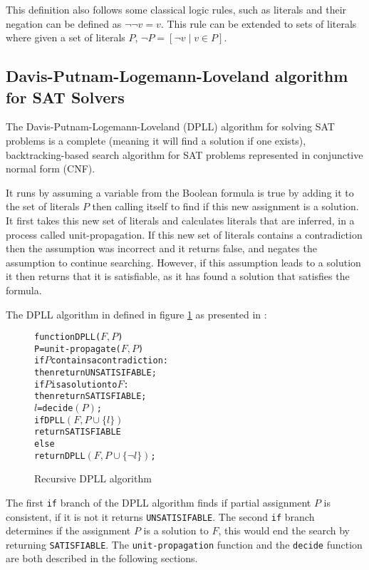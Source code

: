 This definition also follows some classical logic rules, such as literals and their negation can be defined as $\neg \neg v = v$.
This rule can be extended to sets of literals where given a set of literals $P$, $\neg P = [\neg v \mid v \in P]$.

\subsection{Davis-Putnam-Logemann-Loveland algorithm for SAT Solvers}
The Davis-Putnam-Logemann-Loveland (DPLL) algorithm \citep{Davis1960, davis1962machine} for solving SAT problems is a complete (meaning it will find a solution if one exists), 
backtracking-based search algorithm for SAT problems represented in conjunctive normal form (CNF).

It runs by assuming a variable from the Boolean formula is true by adding it to the set of literals $P$ then calling itself to find if this new assignment is a solution.
It first takes this new set of literals and calculates literals that are inferred, in a process called unit-propagation. 
If this new set of literals contains a contradiction then the assumption was incorrect and it returns false, and negates the assumption to continue searching.
However, if this assumption leads to a solution it then returns that it is satisfiable, as it has found a solution that satisfies the formula.

The DPLL algorithm in defined in figure \ref{impl.DPLL} as presented in \cite{dixon2004automating}:
\begin{figure}[h]
\begin{center}
\begin{alltt}
function DPLL(\(F, P\))
   P = unit-propagate(\(F, P\))
   if \(P\) contains a contradiction:
       then return UNSATISIFABLE;
   if \(P\) is a solution to \(F\):
       then return SATISFIABLE;
   \(l\) = decide\((P)\);
   if DPLL\((F, P \cup \{l\})\)
       return SATISFIABLE
   else
       return DPLL\((F, P \cup \{\neg l\})\);
\end{alltt}
  \caption{Recursive DPLL algorithm}
  \label{impl.DPLL}
\end{center}
\end{figure}

The first \verb+if+ branch of the DPLL algorithm finds if partial assignment $P$ is consistent, if it is not it returns \verb+UNSATISIFABLE+.
The second \verb+if+ branch determines if the assignment $P$ is a solution to $F$, this would end the search by returning \verb+SATISFIABLE+.
The \verb+unit-propagation+ function and the \verb+decide+ function are both described in the following sections. 

